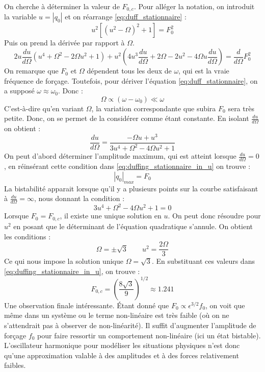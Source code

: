On cherche à déterminer la valeur de $F_{0, c}$. Pour alléger la notation, 
on introduit la variable $u = |q_0|$ et on réarrange \eqref{eq:duff_stationnaire} :
%
\begin{equation}
    u^2[(u^2 - \Omega)^2 + 1] = F_0^2
    \label{eq:duffing_stationnaire_in_u}
\end{equation}
%
Puis on prend la dérivée par rapport à $\Omega$.
%
\begin{equation}
    2u\frac{du}{d\Omega}(u^4 + \Omega^2 - 2\Omega u^2 + 1) + u^2(4u^3\frac{du}{d\Omega} + 2\Omega - 2u^2 - 4\Omega u\frac{du}{d\Omega}) = \frac{d}{d\Omega}F_0^2
\end{equation}
%
On remarque que $F_0$ et $\Omega$ dépendent tous les deux de $\omega$, qui est la vraie fréquence de forçage. Toutefois, pour dériver l'équation \eqref{eq:duff_stationnaire}, on a supposé $\omega \approx \omega_0$. Donc : 
%
\begin{equation*}
    \Omega \propto (\omega - \omega_0) \ll \omega
\end{equation*}
%
C'est-à-dire qu'en variant $\Omega$, la variation correspondante que subira $F_0$ sera très petite. Donc, on se permet de la considérer comme étant constante. En isolant $\frac{du}{d\Omega}$ on obtient :
%
\begin{equation}
    \frac{du}{d\Omega} = \frac{-\Omega u + u^3}{3u^4 + \Omega^2 - 4\Omega u^2 + 1}
\end{equation}
%
On peut d'abord déterminer l'amplitude maximum, qui est atteint lorsque $\frac{du}{d\Omega}=0$, en réinsérant cette condition dans \eqref{eq:duffing_stationnaire_in_u} on trouve :
%
\begin{equation*}
    |q_0|_{max} = F_0
\end{equation*}
%
La bistabilité apparait lorsque qu'il y a plusieurs points sur la courbe satisfaisant à $\frac{du}{d\Omega}=\infty$, nous donnant la condition :
%
\begin{equation}
    3u^4 + \Omega^2 - 4\Omega u^2 + 1 = 0
\end{equation}
%
Lorsque $F_0 = F_{0,c}$, il existe une unique solution en $u$. On peut donc résoudre pour $u^2$ en posant que le déterminant de l'équation quadratique s'annule. On obtient les conditions :
%
\begin{equation}
    \Omega = \pm \sqrt{3}
    \qquad
    u^2 = \frac{2\Omega}{3}
\end{equation}
%
Ce qui nous impose la solution unique $\Omega = \sqrt{3}$. En substituant ces valeurs dans \eqref{eq:duffing_stationnaire_in_u}, on trouve :
%
\begin{equation}
    F_{0,c} = \left(  \frac{8\sqrt{3}}{9}  \right)^{1/2} \approx 1.241
\end{equation}
%
%
Une observation finale intéressante. Étant donné que $F_0 \propto \epsilon^{3/2}f_0$, 
on voit que même dans un système ou le terme non-linéaire est très faible (où on ne s'attendrait pas à observer de non-linéarité). Il suffit d'augmenter l'amplitude de forçage $f_0$ 
pour faire ressortir un comportement non-linéaire (ici un état bistable). L'oscillateur harmonique pour modéliser les situations physiques n'est donc qu'une approximation valable à des amplitudes et à des forces relativement faibles.
